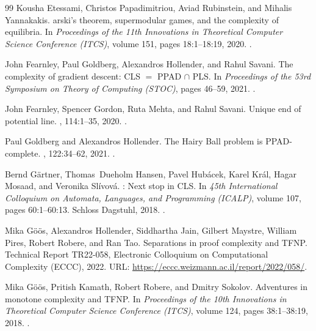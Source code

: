 \begin{thebibliography}{99}
Kousha Etessami, Christos Papadimitriou, Aviad Rubinstein, and Mihalis
  Yannakakis.
arski’s theorem, supermodular games, and the complexity of
  equilibria.
\newblock In {\em Proceedings of the 11th Innovations in Theoretical Computer
  Science Conference (ITCS)}, volume 151, pages 18:1--18:19, 2020.
\newblock \href {https://doi.org/10.4230/LIPIcs.ITCS.2020.18}
  {}.

John Fearnley, Paul Goldberg, Alexandros Hollender, and Rahul Savani.
\newblock The complexity of gradient descent: {CLS} $=$ {PPAD} $\cap$ {PLS}.
\newblock In {\em Proceedings of the 53rd Symposium on Theory of Computing
  (STOC)}, pages 46--59, 2021.
\newblock \href {https://doi.org/10.1145/3406325.3451052}
  {}.

John Fearnley, Spencer Gordon, Ruta Mehta, and Rahul Savani.
\newblock Unique end of potential line.
, 114:1--35, 2020.
\newblock \href {https://doi.org/10.1016/j.jcss.2020.05.007}
  {}.

Paul Goldberg and Alexandros Hollender.
\newblock The {H}airy {B}all problem is {PPAD}-complete.
, 122:34--62, 2021.
\newblock \href {https://doi.org/10.1016/j.jcss.2021.05.004}
  {}.

Bernd G{\"a}rtner, Thomas~Dueholm Hansen, Pavel Hub{\'a}cek, Karel Kr{\'a}l,
  Hagar Mosaad, and Veronika Sl{\'i}vov{\'a}.
: Next stop in {CLS}.
\newblock In {\em 45th International Colloquium on Automata, Languages, and
  Programming (ICALP)}, volume 107, pages 60:1--60:13. Schloss Dagstuhl, 2018.
\newblock \href {https://doi.org/10.4230/LIPICS.ICALP.2018.60}
  {}.

Mika G\"o\"os, Alexandros Hollender, Siddhartha Jain, Gilbert Maystre, William
  Pires, Robert Robere, and Ran Tao.
\newblock Separations in proof complexity and {TFNP}.
\newblock Technical Report TR22-058, Electronic Colloquium on Computational
  Complexity (ECCC), 2022.
\newblock URL: \url{https://eccc.weizmann.ac.il/report/2022/058/}.

Mika G{\"o}{\"o}s, Pritish Kamath, Robert Robere, and Dmitry Sokolov.
\newblock Adventures in monotone complexity and {TFNP}.
\newblock In {\em Proceedings of the 10th Innovations in Theoretical Computer
  Science Conference (ITCS)}, volume 124, pages 38:1--38:19, 2018.
\newblock \href {https://doi.org/10.4230/LIPIcs.ITCS.2019.38}
  {}.


\end{thebibliography}
